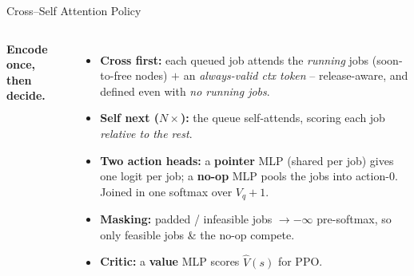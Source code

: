 \begin{frame}{Cross--Self Attention Policy}
\begin{columns}[T,onlytextwidth]
{}

    \footnotesize
    \textbf{Encode once, then decide.}
    \begin{itemize}\setlength\itemsep{3pt}
      \item \textbf{Cross first:} each queued job attends the \emph{running}
            jobs (soon-to-free nodes) $+$ an \emph{always-valid ctx token} --
            release-aware, and defined even with \emph{no running jobs}.
      \item \textbf{Self next ($N\times$):} the queue self-attends, scoring
            each job \emph{relative to the rest}.
      \item \textbf{Two action heads:} a \textbf{pointer} MLP (shared per job)
            gives one logit per job; a \textbf{no-op} MLP pools the jobs into
            action-0. Joined in one softmax over $V_q{+}1$.
      \item \textbf{Masking:} padded / infeasible jobs $\to -\infty$ pre-softmax,
            so only feasible jobs \& the no-op compete.
      \item \textbf{Critic:} a \textbf{value} MLP scores $\hat V(s)$ for PPO.
    \end{itemize}


\end{columns}
\end{frame}
